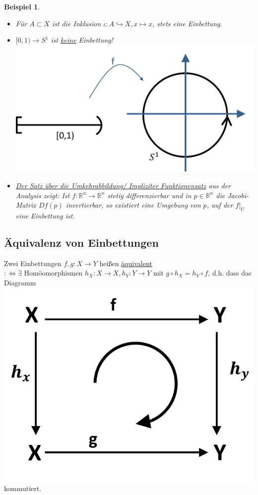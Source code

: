 \documentclass[a4paper,11pt,notitlepage]{report}
\newtheorem{example}{Beispiel}[chapter]
\newcommand{\R}{{\ensuremath{\mathbb{R}}}}
\newenvironment{Kasten}[1]
{
\hspace{0.05\linewidth}
\begin{center}
\begin{minipage}{0.9\linewidth}
\setlength{\fboxsep}{10pt}
\definecolor{shadecolor}{gray}{1}
\definecolor{framecolor}{gray}{0}
\def\FrameCommand{\fcolorbox{framecolor}{shadecolor}}
\MakeFramed {\FrameRestore}
\subsection{#1}
\begin{itshape}
}
{
\end{itshape}
\endMakeFramed
\end{minipage}
\end{center}
}
\begin{document}
\begin{example}
	\begin{itemize}
		\item Für $A \subset X$ ist die Inklusion $\iota \colon A \hookrightarrow X, x \mapsto x$, stets eine Einbettung.
		\item $[0,1) \rightarrow S^1$ ist \underline{keine} Einbettung! \newline
		\includegraphics[scale=0.25]{images/0_1_nach_S1_Pfeil.jpg}
		\item \underline{Der Satz über die Umkehrabbildung/ Impliziter Funktionensatz} aus der Analysis zeigt: 
			\newline
			Ist $f \colon \R^n \rightarrow \R^n$ stetig differenzierbar und in $p \in \R^n$ die Jacobi-Matrix $Df(p)$ invertierbar, so existiert eine Umgebung von $p$, auf der $f \big |_U$ eine Einbettung ist.
	\end{itemize}
\end{example}

\begin{Kasten}{Äquivalenz von Einbettungen}
	Zwei Einbettungen $f,g \colon X \rightarrow Y$ heißen \underline{äquivalent} $:\Leftrightarrow \exists \text{ Homöomorphismen } h_X \colon X \rightarrow X, h_Y \colon Y \rightarrow Y \text{ mit } g \circ h_X = h_Y \circ f$, d.h. dass das Diagramm 
		\includegraphics[scale=0.3]{images/homotopieaequivalenz.jpg} kommutiert.
\end{Kasten}
\end{document}
